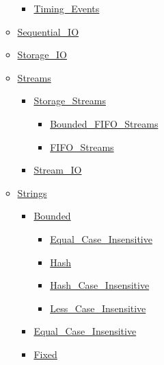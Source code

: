 \documentclass[english]{article}
\begin{document}
\begin{scriptsize}
\begin{multicols*}{5}
\begin{itemize}[leftmargin=0mm]
\begin{itemize}[leftmargin=5mm]
	\begin{itemize}[leftmargin=5mm]
	\item[] \href{http://www.ada-auth.org/standards/22rm/html/RM-D-15.html}{Timing\_Events}
	\end{itemize}
  \item[] \href{http://www.ada-auth.org/standards/22rm/html/RM-A-8-1.html}{Sequential\_IO}
  \item[] \href{http://www.ada-auth.org/standards/22rm/html/RM-A-9.html}{Storage\_IO}
  \item[] \href{http://www.ada-auth.org/standards/22rm/html/RM-13-13-1.html}{Streams}
	\begin{itemize}[leftmargin=5mm]
	\item[] \href{http://www.ada-auth.org/standards/22rm/html/RM-13-13-1.html}{Storage\_Streams}
	  \begin{itemize}[leftmargin=5mm]
	  \item[] \href{http://www.ada-auth.org/standards/22rm/html/RM-13-13-1.html}{Bounded\_FIFO\_Streams}
	  \item[] \href{http://www.ada-auth.org/standards/22rm/html/RM-13-13-1.html}{FIFO\_Streams}
	  \end{itemize}
	\item[] \href{http://www.ada-auth.org/standards/22rm/html/RM-A-12-1.html}{Stream\_IO}
	\end{itemize}
  \item[] \href{http://www.ada-auth.org/standards/22rm/html/RM-A-4-1.html}{Strings}
	\begin{itemize}[leftmargin=5mm]
	\item[] \href{http://www.ada-auth.org/standards/22rm/html/RM-A-4-4.html}{Bounded}
	  \begin{itemize}[leftmargin=5mm]
	  \item[] \href{http://www.ada-auth.org/standards/22rm/html/RM-A-4-10.html}{Equal\_Case\_Insensitive}
	  \item[] \href{http://www.ada-auth.org/standards/22rm/html/RM-A-4-9.html}{Hash}
	  \item[] \href{http://www.ada-auth.org/standards/22rm/html/RM-A-4-9.html}{Hash\_Case\_Insensitive}
	  \item[] \href{http://www.ada-auth.org/standards/22rm/html/RM-A-4-10.html}{Less\_Case\_Insensitive}
	  \end{itemize}
	\item[] \href{http://www.ada-auth.org/standards/22rm/html/RM-A-4-10.html}{Equal\_Case\_Insensitive}
	\item[] \href{http://www.ada-auth.org/standards/22rm/html/RM-A-4-3.html}{Fixed}

\end{itemize}
\end{itemize}
\end{itemize}
\end{multicols*}
\end{scriptsize}
\end{document}
